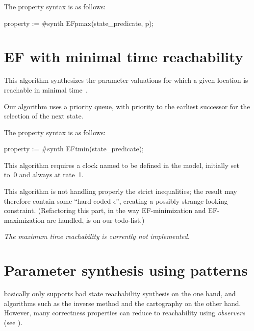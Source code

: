 The property syntax is as follows:

\begin{IMITATORproperty}
property := #synth EFpmax(state_predicate, p);
\end{IMITATORproperty}


\section{EF with minimal time reachability}\label{ss:mode:EFopt}

This algorithm synthesizes the parameter valuations for which a given location is reachable in minimal time~\cite{ABPV19}.

Our algorithm uses a priority queue, with priority to the earliest successor for the selection of the next state.


The property syntax is as follows:

\begin{IMITATORproperty}
property := #synth EFtmin(state_predicate);
\end{IMITATORproperty}

This algorithm requires a clock named  to be defined in the model, initially set to~0 and always at rate~1.

\begin{becareful}
	This algorithm is not handling properly the strict inequalities; the result may therefore contain some ``hard-coded $\epsilon$'', creating a possibly strange looking constraint.
	(Refactoring this part, \eg{} in the way EF-minimization and EF-maximization are handled, is on our todo-list.)
\end{becareful}

\emph{The maximum time reachability is currently not implemented.}


\section{Parameter synthesis using patterns}\label{ss:mode:prop}

\imitator{} basically only supports bad state reachability synthesis on the one hand, and algorithms such as the inverse method and the cartography on the other hand.
However, many correctness properties can reduce to reachability using \emph{observers} (see \cite{ABL98,ABBL98,ABBL03,Andre13ICECCS}).

